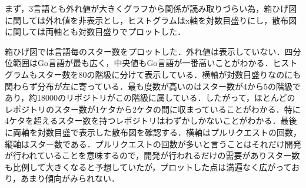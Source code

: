 \documentclass[article]{jlreq}
\begin{document}
まず，3言語とも外れ値が大きくグラフから関係が読み取りづらい為，箱ひげ図に関しては外れ値を非表示とし，ヒストグラムはx軸を対数目盛りにし，散布図に関しては両軸とも対数目盛りでプロットした．

箱ひげ図では言語毎のスター数をプロットした．外れ値は表示していない．四分位範囲はGo言語が最も広く，中央値もGo言語が一番高いことがわかる．ヒストグラムもスター数を80の階級に分けて表示している．横軸が対数目盛りなのにも関わらず分布が左に寄っている．最も度数が高いのはスター数が4から5の階級であり，約18000のリポジトリがこの階級に属している．したがって，ほとんどのレポジトリのスター数が1ケタから2ケタの間に収まっていることがわかる．特に4ケタを超えるスター数を持つレポジトリはわずかしかないことがわかる．最後に両軸を対数目盛で表示した散布図を確認する．横軸はプルリクエストの回数，縦軸はスター数である．プルリクエストの回数が多いと言うことはそれだけ開発が行われていることを意味するので，開発が行われるだけの需要がありスター数も比例して大きくなると予想していたが，プロットした点は満遍なく広がっており，あまり傾向がみられない．


% 
% 

%
% 
\end{document}
